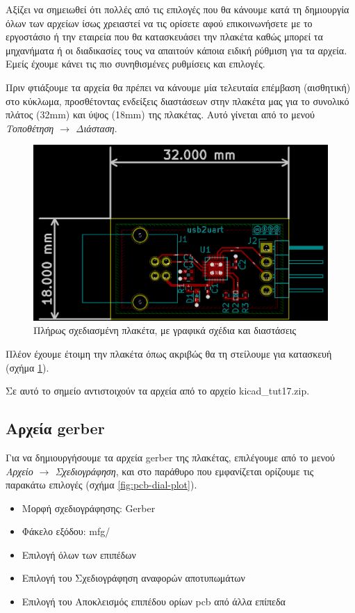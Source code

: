 \documentclass[a4paper]{article}
\begin{document}
Αξίζει να σημειωθεί ότι πολλές από τις επιλογές που θα κάνουμε κατά τη δημιουργία όλων των αρχείων ίσως χρειαστεί να τις ορίσετε αφού επικοινωνήσετε με το εργοστάσιο ή την εταιρεία που θα κατασκευάσει την πλακέτα καθώς μπορεί τα μηχανήματα ή οι διαδικασίες τους να απαιτούν κάποια ειδική ρύθμιση για τα αρχεία. Εμείς έχουμε κάνει τις πιο συνηθισμένες ρυθμίσεις και επιλογές.

Πριν φτιάξουμε τα αρχεία θα πρέπει να κάνουμε μία τελευταία επέμβαση (αισθητική) στο κύκλωμα, προσθέτοντας ενδείξεις διαστάσεων στην πλακέτα μας για το συνολικό πλάτος (32mm) και ύψος (18mm) της πλακέτας. Αυτό γίνεται από το μενού \textit{Τοποθέτηση $\rightarrow$ Διάσταση}.

\begin{figure}
  \begin{center}
    \includegraphics[width=.9\textwidth]{img/pcb-circ-finaldrwn.png}
    \caption{Πλήρως σχεδιασμένη πλακέτα, με γραφικά σχέδια και διαστάσεις}
    \label{fig:pcb-circ-finaldrwn}
  \end{center}
\end{figure}

Πλέον έχουμε έτοιμη την πλακέτα όπως ακριβώς θα τη στείλουμε για κατασκευή (σχήμα \ref{fig:pcb-circ-finaldrwn}).

Σε αυτό το σημείο αντιστοιχούν τα αρχεία από το αρχείο kicad\_tut17.zip.

\subsection{Αρχεία gerber}
Για να δημιουργήσουμε τα αρχεία gerber της πλακέτας, επιλέγουμε από το μενού \textit{Αρχείο $\rightarrow$ Σχεδιογράφηση}, και στο παράθυρο που εμφανίζεται ορίζουμε τις παρακάτω επιλογές (σχήμα \ref{fig:pcb-dial-plot}).

\begin{itemize}
    \item Μορφή σχεδιογράφησης: Gerber
    \item Φάκελο εξόδου: mfg/
    \item Επιλογή όλων των επιπέδων
    \item Επιλογή του Σχεδιογράφηση αναφορών αποτυπωμάτων
    \item Επιλογή του Αποκλεισμός επιπέδου ορίων pcb από άλλα επίπεδα
\end{itemize}
\end{document}
